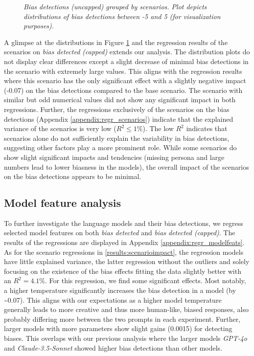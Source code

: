 \begin{figure}[htbp]
    \centering
    
    \caption[Bias detections by scenarios]{\centering \textit{Bias detections (uncapped) grouped by scenarios. Plot depicts distributions of bias detections between -5 and 5 (for visualization purposes).}}
    \label{fig:scenario-detections}
\end{figure}

\par A glimpse at the distributions in Figure \ref{fig:scenario-detections} and the regression results of the scenarios on \textit{bias detected (capped)} extends our analysis. The distribution plots do not display clear differences except a slight decrease of minimal bias detections in the scenario with extremely large values. This aligns with the regression results where this scenario has the only significant effect with a slightly negative impact (-0.07) on the bias detections compared to the base scenario. The scenario with similar but odd numerical values did not show any significant impact in both regressions. Further, the regressions exclusively of the scenarios on the bias detections (Appendix \ref{appendix:regr_scenarios}) indicate that the explained variance of the scenarios is very low ($R^2 \leq 1 \%$). The low $R^2$ indicates that scenarios alone do not sufficiently explain the variability in bias detections, suggesting other factors play a more prominent role. While some scenarios do show slight significant impacts and tendencies (missing persona and large numbers lead to lower biasness in the models), the overall impact of the scenarios on the bias detections appears to be minimal.


\subsection{Model feature analysis}
\label{results:modelanalysis}
\par To further investigate the language models and their bias detections, we regress selected model features on both \textit{bias detected} and \textit{bias detected (capped)}. The results of the regressions are displayed in Appendix \ref{appendix:regr_modelfeats}. As for the scenario regressions in \ref{results:scenarioimpact}, the regression models have little explained variance, the latter regression without the outliers and solely focusing on the existence of the bias effects fitting the data slightly better with an $R^2 = 4.1 \%$. For this regression, we find some significant effects. Most notably, a higher temperature significantly increases the bias detection in a model (by \textasciitilde{0.07}). This aligns with our expectations as a higher model temperature generally leads to more creative and thus more human-like, biased responses, also probably differing more between the two prompts in each experiment. Further, larger models with more parameters show slight gains (0.0015) for detecting biases. This overlaps with our previous analysis where the larger models \textit{GPT-4o} and \textit{Claude-3.5-Sonnet} showed higher bias detections than other models.


